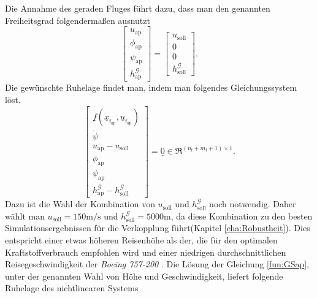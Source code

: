 Die Annahme des geraden Fluges führt dazu, dass man den genannten Freiheitsgrad folgenderma{\ss}en ausnutzt
\begin{equation}
\begin{bmatrix} 
u_\mathrm{ap} \\
\phi_\mathrm{ap} \\
\psi_\mathrm{ap}\\
h^\mathcal{G}_\mathrm{ap}
\end{bmatrix} = \begin{bmatrix} 
u_\mathrm{soll} \\
0 \\
0\\
h^\mathcal{G}_\mathrm{soll}
\end{bmatrix}.
\end{equation} 
Die gewünschte Ruhelage findet man, indem man folgendes Gleichungssystem löst.
\begin{equation}
\label{fun:GSap}
\begin{bmatrix} 
\underline{f}(\underline{x}_\mathrm{f_{ap}},\underline{u}_\mathrm{f_{ap}}) \\
\dot{\psi} \\
u_\mathrm{ap} - u_\mathrm{soll}\\
\phi_\mathrm{ap}\\
\psi_\mathrm{ap}\\
h^\mathcal{G}_\mathrm{ap} -h^\mathcal{G}_\mathrm{soll}
\end{bmatrix} = \underline{0} \in \Re^{(n_\mathrm{f}+m_\mathrm{f}+1)\times 1}.
\end{equation}
Dazu ist die Wahl der Kombination von $u_\mathrm{soll}$ und $h^\mathcal{G}_\mathrm{soll}$ noch notwendig. Daher wählt man $u_\mathrm{soll} = 150 \mathrm{m/s}$ und  $h^\mathcal{G}_\mathrm{soll} = 5000 \mathrm{m}$, da diese Kombination zu den  besten Simulationsergebnissen für die Verkopplung führt(Kapitel \ref{cha:Robustheit}). Dies entspricht einer etwas höheren Reisenhöhe als der, die für den optimalen Kraftstoffverbrauch \cite{OptimalHeight} empfohlen wird und einer niedrigen durchschnittlichen Reisegeschwindigkeit der \textit{Boeing 757-200} \cite{B7572}. Die Lösung der Gleichung \eqref{fun:GSap}, unter der genannten Wahl von Höhe und Geschwindigkeit, liefert folgende Ruhelage des nichtlinearen Systems \\
